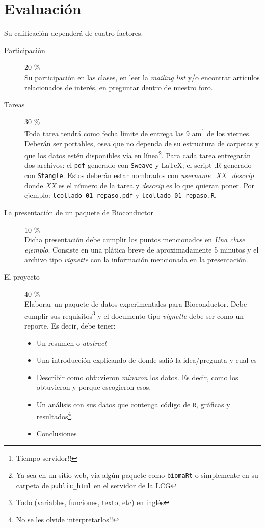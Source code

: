 \documentclass[letterpaper,12pt]{article}
\newcommand{\pl}[1]{\texttt{#1}}
\newcommand{\myurlshort}[2]{\href{http://#1}{{\textsf{#2}}}}
\begin{document}
\section{Evaluación}
Su calificación dependerá de cuatro factores:
  \begin{description}
  \item[Participación] 20 \% \\Su participación en las clases, en leer la \emph{mailing list} y/o encontrar artículos relacionados de interés, en preguntar dentro de nuestro \myurlshort{foros.nnb.unam.mx/viewforum.php?f=111}{foro}.
  \item[Tareas] 30 \% \\Toda tarea tendrá como fecha límite de entrega las 9 am\footnote{Tiempo servidor!!} de los viernes. Deberán ser portables, osea que no dependa de su estructura de carpetas y que los datos estén disponibles vía en línea\footnote{Ya sea en un sitio web, vía algún paquete como \pl{biomaRt} o simplemente en su carpeta de \pl{public\_html} en el servidor de la LCG}. Para cada tarea entregarán dos archivos: el \pl{pdf} generado con \pl{Sweave} y \LaTeX; el script .R generado con \pl{Stangle}. Estos deberán estar nombrados con \emph{username\_XX\_descrip} donde \emph{XX} es el número de la tarea y \emph{descrip} es lo que quieran poner. Por ejemplo: \pl{lcollado\_01\_repaso.pdf} y \pl{lcollado\_01\_repaso.R}.
  \item[La presentación de un paquete de Bioconductor] 10 \% \\Dicha presentación debe cumplir los puntos mencionados en \emph{Una clase ejemplo}. Consiste en una plática breve de aproximadamente 5 minutos y el archivo tipo \emph{vignette} con la información mencionada en la presentación.
  \item[El proyecto] 40 \% \\ Elaborar un paquete de datos experimentales para Bioconductor. Debe cumplir sus requisitos\footnote{Todo (variables, funciones, texto, etc) en inglés} y el documento tipo \emph{vignette} debe ser como un reporte. Es decir, debe tener:
  \begin{itemize}
  \item Un resumen o \emph{abstract}
  \item Una introducción explicando de donde salió la idea/pregunta y cual es
  \item Describir como obtuvieron \emph{minaron} los datos. Es decir, como los obtuvieron y porque escogieron esos.
  \item Un análisis con sus datos que contenga código de \pl{R}, gráficas y resultados\footnote{No se les olvide interpretarlos!!}.
  \item Conclusiones
  \end{itemize}
  \end{description}
\end{document}
